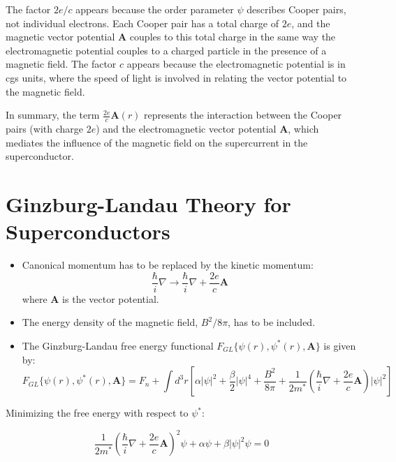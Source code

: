 \documentclass{article}
\begin{document}
\begin{theorem}
The factor \(2e/c\) appears because the order parameter \(\psi\) describes Cooper pairs, not individual electrons. Each Cooper pair has a total charge of \(2e\), and the magnetic vector potential \(\mathbf{A}\) couples to this total charge in the same way the electromagnetic potential couples to a charged particle in the presence of a magnetic field. The factor \(c\) appears because the electromagnetic potential is in cgs units, where the speed of light is involved in relating the vector potential to the magnetic field.

In summary, the term \(\frac{2e}{c} \mathbf{A}(r)\) represents the interaction between the Cooper pairs (with charge \(2e\)) and the electromagnetic vector potential \(\mathbf{A}\), which mediates the influence of the magnetic field on the supercurrent in the superconductor.
    
\end{theorem}


\section{Ginzburg-Landau Theory for Superconductors}

\begin{itemize}
    \item Canonical momentum has to be replaced by the kinetic momentum:
    \[
    \frac{\hbar}{i} \nabla \rightarrow \frac{\hbar}{i} \nabla + \frac{2e}{c} \mathbf{A}
    \]
    where $\mathbf{A}$ is the vector potential.

    \item The energy density of the magnetic field, $B^2 / 8\pi$, has to be included.

    \item The Ginzburg-Landau free energy functional $F_{GL} \{ \psi(r), \psi^*(r), \mathbf{A} \}$ is given by:
    \begin{equation}
    F_{GL} \{ \psi(r), \psi^*(r), \mathbf{A} \} = F_n + \int d^3r \left[ \alpha |\psi|^2 + \frac{\beta}{2} |\psi|^4 + \frac{B^2}{8\pi} + \frac{1}{2m^*} \left( \frac{\hbar}{i} \nabla + \frac{2e}{c} \mathbf{A} \right) |\psi|^2 \right]
    \end{equation}
\end{itemize}

Minimizing the free energy with respect to $\psi^*$:

\begin{equation}
    \frac{1}{2m^*} \left( \frac{\hbar}{i} \nabla + \frac{2e}{c} \mathbf{A} \right)^2 \psi + \alpha \psi + \beta |\psi|^2 \psi = 0
\end{equation}
\end{document}
